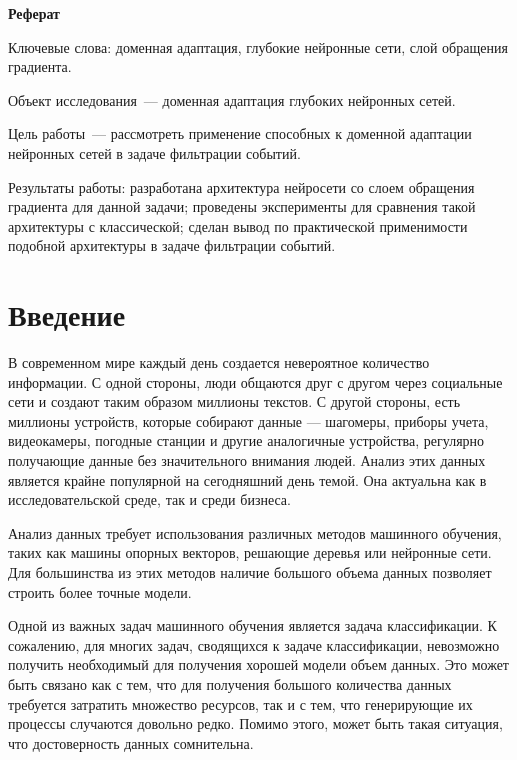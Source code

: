 \documentclass[14pt, a4paper]{extarticle}
\begin{document}
\setcounter{page}{1}
\thispagestyle{empty}

\centerline{\large \textbf{Реферат}}

\bigskip
\bigskip

\noindent
Ключевые слова: доменная адаптация, глубокие нейронные сети, слой обращения градиента.

\medskip 

\noindent
Объект исследования~— доменная адаптация глубоких нейронных сетей.

\medskip 

\noindent
Цель работы~— рассмотреть применение способных к доменной адаптации нейронных сетей в задаче фильтрации событий.

\medskip 

\noindent
Результаты работы: разработана архитектура нейросети со слоем обращения градиента для данной задачи; проведены эксперименты для сравнения такой архитектуры с классической; сделан вывод по практической применимости подобной архитектуры в задаче фильтрации событий.

\newpage

\tableofcontents

\newpage

\section*{Введение}

В современном мире каждый день создается невероятное количество информации. С одной стороны, люди общаются друг с другом через социальные сети и создают таким образом миллионы текстов. С другой стороны, есть миллионы устройств, которые собирают данные — шагомеры, приборы учета, видеокамеры, погодные станции и другие аналогичные устройства, регулярно получающие данные без значительного внимания людей. Анализ этих данных является крайне популярной на сегодняшний день темой. Она актуальна как в исследовательской среде, так и среди бизнеса. 

Анализ данных требует использования различных методов машинного обучения, таких как машины опорных векторов, решающие деревья или нейронные сети. Для большинства из этих методов наличие большого объема данных позволяет строить более точные модели. 

Одной из важных задач машинного обучения является задача классификации. К сожалению, для многих задач, сводящихся к задаче классификации, невозможно получить необходимый для получения хорошей модели объем данных. Это может быть связано как с тем, что для получения большого количества данных требуется затратить множество ресурсов, так и с тем, что генерирующие их процессы случаются довольно редко. Помимо этого, может быть такая ситуация, что достоверность данных сомнительна.
\end{document}
